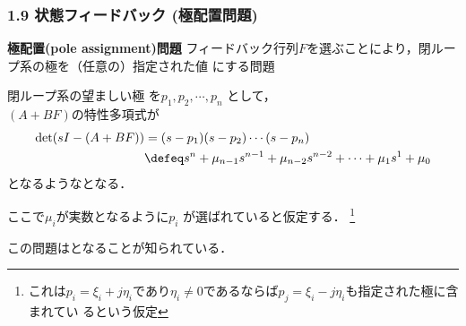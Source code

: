 \begin{frame}[t]
\frametitle{1.9 状態フィードバック (極配置問題)}
\begin{block}{\bf 極配置(pole assignment)問題}
フィードバック行列$F$を選ぶことにより，閉ループ系の極を（任意の）指定された値
にする問題
\end{block}

閉ループ系の望ましい極
を$p_1, p_2, \cdots, p_n$ として，\\
$(A + B F)$の特性多項式が
\begin{align}
 \det (s I - (A + B F))
 &= (s - p_1)(s - p_2) \cdots (s - p_n) \nonumber \\
 &\defeq s^n + \mu_{n-1} s^{n-1} + \mu_{n-2} s^{n-2}
  + \cdots + \mu_1 s^1 + \mu_0
\end{align}
となるようなとなる．

\vspace{5mm}

ここで$\mu_i$が実数となるように$p_i$
が選ばれていると仮定する．
\footnote{これは$p_i = \xi_i + j \eta_i $であり$\eta_i
\neq 0$であるならば$p_j = \xi_i - j \eta_i$も指定された極に含まれてい
るという仮定}

この問題は\underline{}となることが知られている．

\end{frame}


